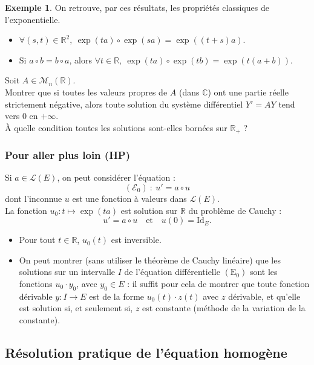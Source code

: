 \documentclass[french]{article}
\newcommand{\R}{\mathbb{R}}
\newcommand{\C}{\mathbb{C}}
\newcommand{\Id}{\text{Id}}
\theoremstyle{plain}
\theoremstyle{definition}
\newtheorem*{ex}{Exemple}
\theoremstyle{remark}
\begin{document}
\begin{ex}
	On retrouve, par ces résultats, les propriétés classiques de l'exponentielle.
	\begin{itemize}
		\item $\forall (s,t)\in\R^2,\ \exp(ta)\circ\exp(sa)=\exp((t+s)a)$.
		\item Si $a\circ b=b\circ a$, alors $\forall t\in\R,\ \exp(ta)\circ\exp(tb)=\exp(t(a+b))$.
	\end{itemize}
\end{ex}

\begin{exo}
	Soit $A\in\mathcal{M}_n(\R)$.\\
	Montrer que si toutes les valeurs propres de $A$ (dans $\C$) ont une partie réelle strictement négative, alors toute solution du système différentiel $Y'=AY$ tend vers $0$ en $+\infty$.\\
	À quelle condition toutes les solutions sont-elles bornées sur $\R_+$ ?
\end{exo}

\subsubsection*{Pour aller plus loin (HP)}

Si $a\in\mathcal{L}(E)$, on peut considérer l'équation :
$$(\mathcal{E}_0)\ :\ u'=a\circ u$$ dont l'inconnue $u$ est une fonction à valeurs dans $\mathcal{L}(E)$. \\
La fonction $u_0:t\mapsto\exp(ta)$ est solution sur $\R$ du problème de Cauchy :
$$u'=a\circ u\quad\text{et}\quad u(0)=\Id_E.$$
\begin{itemize}
	\item Pour tout $t\in\R$, $u_0(t)$ est inversible.
	\item On peut montrer (sans utiliser le théorème de Cauchy linéaire) que les solutions sur un intervalle $I$ de l'équation différentielle $(\text{E}_0)$ sont les fonctions $u_0\cdot y_0$, avec $y_0\in E$ : il suffit pour cela de montrer que toute fonction dérivable $y:I\to E$ est de la forme $u_0(t)\cdot z(t)$ avec $z$ dérivable, et qu'elle est solution si, et seulement si, $z$ est constante (méthode de la variation de la constante).
\end{itemize} 

\subsection{Résolution pratique de l'équation homogène}
\end{document}

